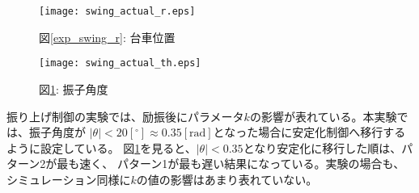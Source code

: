 \begin{figure}[htbp]
    \begin{minipage}{0.5\hsize}
        \begin{center}
            \texttt{[image: swing\_actual\_r.eps]}
            \caption{図\ref{exp_swing_r}: 台車位置}
            \label{exp_swing_r}
        \end{center}
    \end{minipage}
    \begin{minipage}{0.5\hsize}
        \begin{center}
            \texttt{[image: swing\_actual\_th.eps]}
            \caption{図\ref{exp_swing_th}: 振子角度}
            \label{exp_swing_th}
        \end{center}
    \end{minipage}
\end{figure}

振り上げ制御の実験では、励振後にパラメータ$k$の影響が表れている。本実験では、振子角度が
$|\theta| < 20[^\circ] \approx 0.35[\mbox{rad}]$となった場合に安定化制御へ移行するように設定している。
図\ref{exp_swing_th}を見ると、$|\theta| < 0.35$となり安定化に移行した順は、パターン2が最も速く、
パターン1が最も遅い結果になっている。実験の場合も、シミュレーション同様に$k$の値の影響はあまり表れていない。



